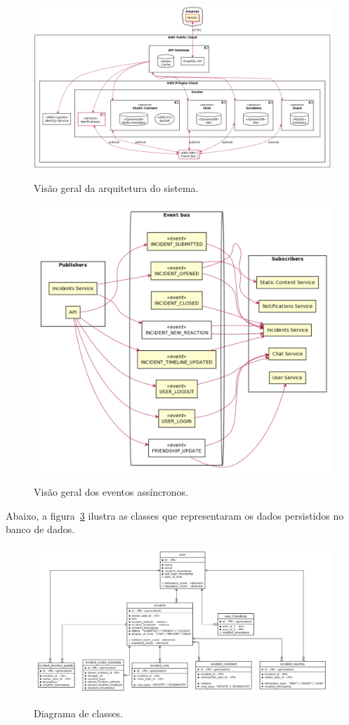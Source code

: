 \begin{figure}[htbp]
	\caption{\small Visão geral da arquitetura do sistema.}
	\centering
	\includegraphics[scale=0.50]{figs/arquitetura.png}
	\label{f.diagrama-arquitetura}
\end{figure}

\begin{figure}[htbp]
	\caption{\small Visão geral dos eventos assíncronos.}
	\centering
	\includegraphics[scale=0.50]{figs/eventos.png}
	\label{f.diagrama-eventos}
\end{figure}


Abaixo, a figura~\ref{f.diagrama-classes} ilustra as classes que representaram os dados persistidos no banco de dados.

\begin{figure}[htbp]
	\caption{\small Diagrama de classes.}
	\centering
	\includegraphics[scale=0.50]{figs/diagrama-de-classes.png}
	\label{f.diagrama-classes}
\end{figure}


